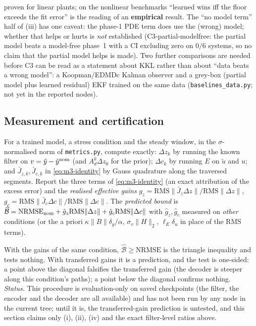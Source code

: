 {proven for linear plants; on the nonlinear benchmarks ``learned wins iff the floor exceeds the fit error'' is the reading
of an \textbf{empirical} result. The ``no model term'' half of (iii) has one caveat: the phase-1 PDE term does use the
(wrong) model; whether that helps or hurts is \emph{not} established (C3-partial-modelfree: the partial model beats a
model-free phase~1 with a CI excluding zero on $0/6$ systems, so no claim that the partial model helps is made). Two
further comparisons are needed before C3 can be read as a statement about KKL rather than about ``data beats a wrong
model'': a Koopman/EDMDc Kalman observer and a grey-box (partial model plus learned residual) EKF trained on the same data
(\texttt{baselines\_data.py}; not yet in the reported nodes).\par}

\subsection{Measurement and certification}

\begin{definition}\label{def:m3-measured}
For a trained model, a stress condition and the steady window, in the $\sigma$-normalised norm of
\texttt{metrics.py}, compute exactly: $\Delta z_k$ by running the known filter on $v=\tilde y-\tilde y^{\rm nom}$
(and $A_d^k\Delta z_0$ for the prior); $\Delta c_k$ by running $E$ on $\tilde u$ and $u$; and
$\bar J_{z,k},\bar J_{c,k}$ in \eqref{eq:m3-identity} by Gauss quadrature along the traversed segments.
Report the three terms of \eqref{eq:m3-identity} (an exact attribution of the excess error) and the
\emph{realised effective gains} $g_z=\mathrm{RMS}\|\bar J_z\Delta z\|/\mathrm{RMS}\|\Delta z\|$,
$g_c=\mathrm{RMS}\|\bar J_c\Delta c\|/\mathrm{RMS}\|\Delta c\|$. The \emph{predicted bound} is
$\widehat{\mathcal B}=\mathrm{NRMSE}_{\rm nom}+\hat g_z\mathrm{RMS}\|\Delta z\|+\hat g_c\mathrm{RMS}\|\Delta c\|$ with
$\hat g_z,\hat g_c$ measured on \emph{other} conditions (or the a priori $\kappa\|B\|\delta_y/\alpha$,
$\sigma_v\|H\|_2$, $\ell_E\delta_u$ in place of the RMS terms).
\end{definition}

With the gains of the same condition, $\widehat{\mathcal B}\ge\mathrm{NRMSE}$ is the triangle
inequality and tests nothing. With transferred gains it is a prediction, and the test is one-sided:
a point above the diagonal falsifies the transferred gain (the decoder is steeper along this
condition's paths); a point below the diagonal confirms nothing. \emph{Status.} This procedure is evaluation-only on
saved checkpoints (the filter, the encoder and the decoder are all available) and has not been run by any node in the
current tree; until it is, the transferred-gain prediction is untested, and this section claims only (i), (ii), (iv) and
the exact filter-level ratios above.

